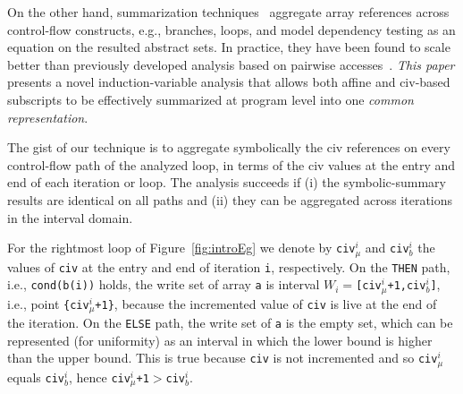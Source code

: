 \documentclass{sig-alternate}
\begin{document}
On the other hand, summarization techniques~\cite{SUIF,LMAD,CosPLDI} aggregate 
array references across control-flow constructs, e.g., branches, loops, and  
model dependency testing as an equation on the resulted abstract sets.
%
In practice, they have been found to scale better than previously developed
analysis based on pairwise accesses~\cite{SUIF}.
% 
%
{\em This paper} presents a novel induction-variable analysis
that allows both affine and {\sc civ}-based subscripts
%
to be effectively summarized at program level into one {\em common representation}.

The gist of our technique is to aggregate symbolically the {\sc civ} 
references on every control-flow path of the analyzed loop, in terms
of the {\sc civ} values at the entry and end of each iteration or loop.
The analysis succeeds if (i) the symbolic-summary results are identical 
on all paths and (ii) they can be aggregated across iterations %
in the interval domain. %

For the rightmost loop of Figure~\ref{fig:introEg} we denote by 
{\tt civ$_\mu^i$} and {\tt civ$_b^i$} the values of {\tt civ} 
at the entry and end of iteration {\tt i}, respectively.
%
On the {\tt THEN} path, i.e., {\tt cond(b(i))} holds, the write set 
of array {\tt a} is interval $W_i=${\tt [civ$_\mu^i$+1,civ$_b^i$]}, 
i.e., point {\tt \{civ$_\mu^i$+1\}}, because the incremented value 
of {\tt civ} is live at the end of the iteration. 
%
On the {\tt ELSE} path, the write set of {\tt a} is the empty set,
which can be represented (for uniformity) as an interval
%
in which the lower bound is higher than the upper bound.
This is true because {\tt civ} is not incremented and so
{\tt civ$_\mu^i$} equals {\tt civ$_b^i$}, hence 
{\tt civ$_\mu^i$+1$ > $civ$_b^i$}.
%
\end{document}
